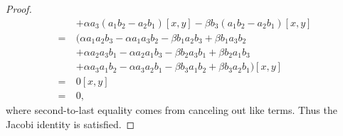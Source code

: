 \documentclass[12pt]{article}
\theoremstyle{definition}
\begin{document}
\begin{proof}
\begin{align*}
		    & + \alpha a_3(a_1b_2-a_2b_1)[x, y] - \beta b_3(a_1b_2-a_2b_1)[x,y]            \\
		=\  & (\alpha a_1a_2b_3 -\alpha a_1a_3b_2 - \beta b_1a_2b_3+ \beta b_1a_3b_2       \\
		    & + \alpha a_2a_3b_1-\alpha a_2a_1b_3 - \beta b_2a_3b_1+ \beta b_2a_1b_3       \\
		    & + \alpha a_3a_1b_2-\alpha a_3a_2b_1 - \beta b_3a_1b_2+ \beta b_3a_2b_1)[x,y] \\
		=\  & 0[x, y]                                                                      \\
		=\  & 0,
	\end{align*}
	where second-to-last equality comes from canceling out like terms.
	Thus the Jacobi identity is satisfied.
\end{proof}
\end{document}
